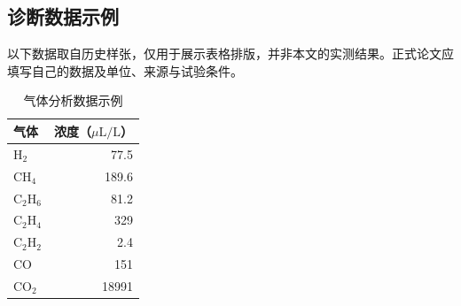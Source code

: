 \begin{appendices}
\chapter{诊断数据示例}
以下数据取自历史样张，仅用于展示表格排版，并非本文的实测结果。正式论文应填写自己的数据及单位、来源与试验条件。

\begin{table}[htbp]
  \centering
  \caption{气体分析数据示例}
  \begin{tabular}{lr}
    \toprule
    气体 & 浓度（$\mu\mathrm{L}/\mathrm{L}$） \\
    \midrule
    $\mathrm{H}_2$ & 77.5 \\
    $\mathrm{CH}_4$ & 189.6 \\
    $\mathrm{C}_2\mathrm{H}_6$ & 81.2 \\
    $\mathrm{C}_2\mathrm{H}_4$ & 329 \\
    $\mathrm{C}_2\mathrm{H}_2$ & 2.4 \\
    $\mathrm{CO}$ & 151 \\
    $\mathrm{CO}_2$ & 18991 \\
    \bottomrule
  \end{tabular}
\end{table}
\end{appendices}
